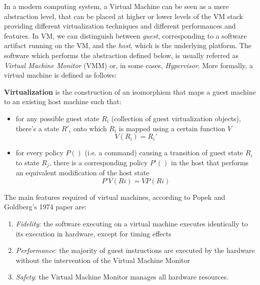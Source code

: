 In a modern computing system, a Virtual Machine can be seen as a mere abstraction level, that can be placed at higher or lower levels of the VM stack providing different virtualization techniques and different performances and features.
In VM, we can distinguish between \emph{guest}, corresponding to a software artifact running on the VM, and the \emph{host}, which is the underlying platform. The software which performs the abstraction defined below, is usually referred as \emph{Virtual Machine Monitor} (VMM) or, in some cases, \emph{Hypervisor}.
More formally, a virtual machine is defined as follows:
\begin{definition}
\textbf{Virtualization} is the construction of an isomorphism that maps a guest machine to an
existing host machine such that:
\begin{itemize}
\item for any possible guest state $R_i$ (collection of guest virtualization objects), there's a state $R'_i$ onto which $R_i$ is mapped using a certain function $V$ 
$$V(R_i) = R_i’$$
\item for every policy $P()$ (i.e. a command) causing a transition of guest state $R_i$ to state $R_j$, there
is a corresponding policy $P’()$ in the host that performs an equivalent modification of the host state
$$P’  V(R i )=V  P(R i )$$
\end{itemize}
\end{definition}

The main features required of virtual machines, according to Popek and Goldberg's 1974 paper %
are:
\begin{enumerate}
\item \emph{Fidelity}: the software executing on a virtual machine executes identically to its execution in hardware, except for timing effects
\item \emph{Performance}: the majority of guest instructions are executed by the hardware without the intervention of the Virtual Machine Monitor
\item \emph{Safety}: the Virtual Machine Monitor manages all hardware resources.
\end{enumerate}